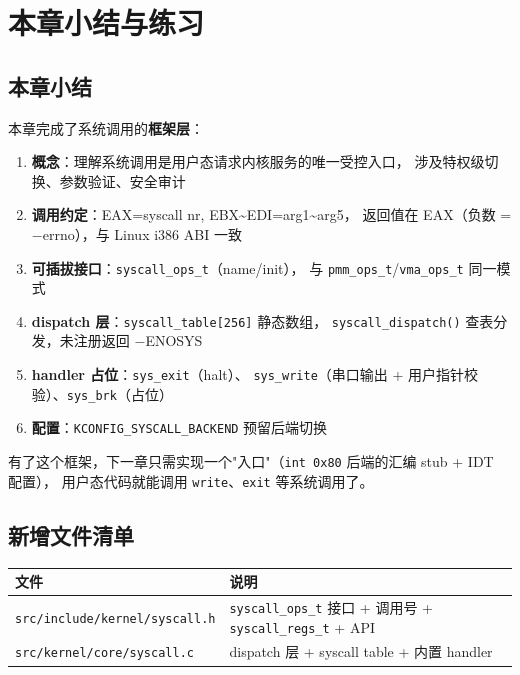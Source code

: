 \section{本章小结与练习}

\subsection{本章小结}

本章完成了系统调用的\textbf{框架层}：

\begin{enumerate}
  \item \textbf{概念}：理解系统调用是用户态请求内核服务的唯一受控入口，
    涉及特权级切换、参数验证、安全审计
  \item \textbf{调用约定}：EAX=syscall nr, EBX\textasciitilde EDI=arg1\textasciitilde arg5，
    返回值在 EAX（负数 = $-$errno），与 Linux i386 ABI 一致
  \item \textbf{可插拔接口}：\texttt{syscall\_ops\_t}（name/init），
    与 \texttt{pmm\_ops\_t}/\texttt{vma\_ops\_t} 同一模式
  \item \textbf{dispatch 层}：\texttt{syscall\_table[256]} 静态数组，
    \texttt{syscall\_dispatch()} 查表分发，未注册返回 $-$ENOSYS
  \item \textbf{handler 占位}：\texttt{sys\_exit}（halt）、
    \texttt{sys\_write}（串口输出 + 用户指针校验）、\texttt{sys\_brk}（占位）
  \item \textbf{配置}：\texttt{KCONFIG\_SYSCALL\_BACKEND} 预留后端切换
\end{enumerate}

有了这个框架，下一章只需实现一个"入口"（\texttt{int 0x80} 后端的汇编 stub + IDT 配置），
用户态代码就能调用 \texttt{write}、\texttt{exit} 等系统调用了。

\subsection{新增文件清单}

\begin{center}
\begin{tabular}{ll}
\toprule
\textbf{文件} & \textbf{说明} \\
\midrule
\texttt{src/include/kernel/syscall.h} & \texttt{syscall\_ops\_t} 接口 + 调用号 + \texttt{syscall\_regs\_t} + API \\
\texttt{src/kernel/core/syscall.c}    & dispatch 层 + syscall table + 内置 handler \\
\bottomrule
\end{tabular}
\end{center}

